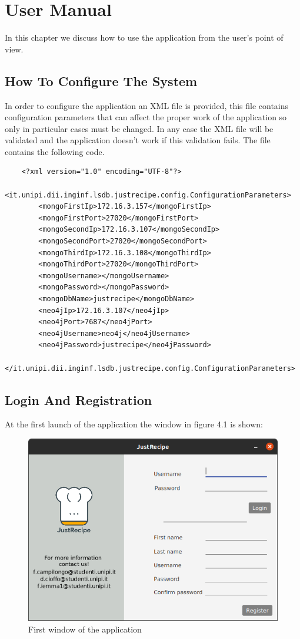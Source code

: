 \documentclass[a4paper]{report}
\begin{document}
\chapter{User Manual}
In this chapter we discuss how to use the application from the user's point of view.
\section{How To Configure The System}
In order to configure the application an XML file is provided, this file contains configuration parameters that can affect the proper work of the application so only in particular cases must be changed. In any case the XML file will be validated and the application doesn't work if this validation fails. The file contains the following code.

\lstset{language=code}
\begin{lstlisting}
	<?xml version="1.0" encoding="UTF-8"?>
	<it.unipi.dii.inginf.lsdb.justrecipe.config.ConfigurationParameters>
		<mongoFirstIp>172.16.3.157</mongoFirstIp>
		<mongoFirstPort>27020</mongoFirstPort>
		<mongoSecondIp>172.16.3.107</mongoSecondIp>
		<mongoSecondPort>27020</mongoSecondPort>
		<mongoThirdIp>172.16.3.108</mongoThirdIp>
		<mongoThirdPort>27020</mongoThirdPort>
		<mongoUsername></mongoUsername>
		<mongoPassword></mongoPassword>
		<mongoDbName>justrecipe</mongoDbName>
		<neo4jIp>172.16.3.107</neo4jIp>
		<neo4jPort>7687</neo4jPort>
		<neo4jUsername>neo4j</neo4jUsername>
		<neo4jPassword>justrecipe</neo4jPassword>
	</it.unipi.dii.inginf.lsdb.justrecipe.config.ConfigurationParameters>
\end{lstlisting}


\newpage
\section{Login And Registration}
At the first launch of the application the window in figure 4.1 is shown:
\begin{figure}[htpb]
	\centering
	\includegraphics[scale=0.3]{img/user_manual/login.png}
	\caption{First window of the application}
\end{figure}
\end{document}
